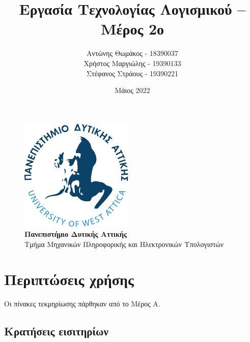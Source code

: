 \documentclass[12pt]{article}
\title{Εργασία Τεχνολογίας Λογισμικού -- Μέρος 2ο}
\author{Αντώνης Θωμάκος - 18390037 \\
Χρήστος Μαργιώλης - 19390133 \\
Στέφανος Στράους - 19390221}
\date{Μάιος 2022}
\begin{document}
\begin{titlepage}
        \maketitle
        \begin{figure}[t!]
        \begin{center}
        \includegraphics[scale=1.0]{./res/uniwa-logo.pdf} \\
        \Large
        \textbf{Πανεπιστήμιο Δυτικής Αττικής} \\
        \large
        Τμήμα Μηχανικών Πληροφορικής και Ηλεκτρονικών Υπολογιστών
        \end{center}
        \end{figure}
\end{titlepage}

\renewcommand{\contentsname}{Περιεχόμενα}
\tableofcontents
\pagebreak

\section{Περιπτώσεις χρήσης}

Οι πίνακες τεκμηρίωσης πάρθηκαν από το Μέρος Α.

\subsection{Κρατήσεις εισιτηρίων}
\end{document}
